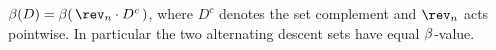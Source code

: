 \begin{lemma}
  \label{lem:beta_rev}
  \rocqok
  $\beti(D) = \beti(\,\rev_n \cdot D^{c}\,)$, where $D^{c}$ denotes the
  set complement and $\rev_n$ acts pointwise.  In particular the two
  alternating descent sets have equal $\beta$-value.
\end{lemma}
